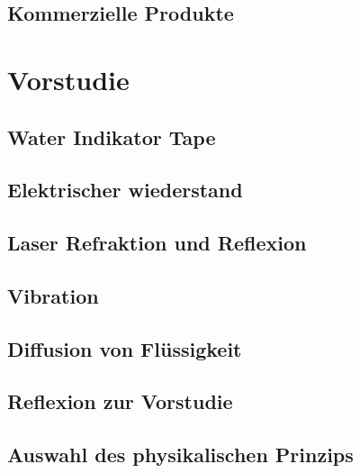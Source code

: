 \documentclass[a4paper,12pt]{article}
\begin{document}
\subsection{Kommerzielle Produkte}




\newpage
\section{Vorstudie}


\subsection{Water Indikator Tape}


\newpage
\subsection{Elektrischer wiederstand}

\newpage
\subsection{Laser Refraktion und Reflexion}


\subsection{Vibration}

\newpage
\subsection{Diffusion von Flüssigkeit}
\label{sec:TinteVersuchsaufbau}


\subsection{Reflexion zur Vorstudie}


\subsection{Auswahl des physikalischen Prinzips}

\end{document}
